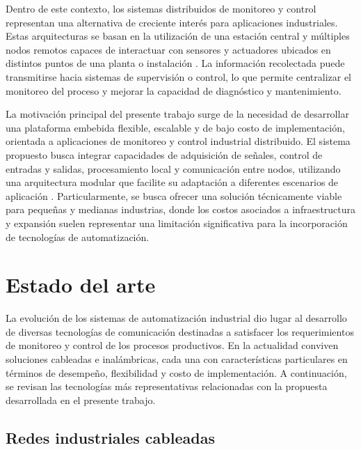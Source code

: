 Dentro de este contexto, los sistemas distribuidos de monitoreo y control representan una alternativa de creciente interés para aplicaciones industriales. Estas arquitecturas se basan en la utilización de una estación central y múltiples nodos remotos capaces de interactuar con sensores y actuadores ubicados en distintos puntos de una planta o instalación \cite{review_iwn_industry40}. La información recolectada puede transmitirse hacia sistemas de supervisión o control, lo que permite centralizar el monitoreo del proceso y mejorar la capacidad de diagnóstico y mantenimiento.

La motivación principal del presente trabajo surge de la necesidad de desarrollar una plataforma embebida flexible, escalable y de bajo costo de implementación, orientada a aplicaciones de monitoreo y control industrial distribuido. El sistema propuesto busca integrar capacidades de adquisición de señales, control de entradas y salidas, procesamiento local y comunicación entre nodos, utilizando una arquitectura modular que facilite su adaptación a diferentes escenarios de aplicación \cite{overview_embedded_i40}. Particularmente, se busca ofrecer una solución técnicamente viable para pequeñas y medianas industrias, donde los costos asociados a infraestructura y expansión suelen representar una limitación significativa para la incorporación de tecnologías de automatización.


\section{Estado del arte}

La evolución de los sistemas de automatización industrial dio lugar al desarrollo de diversas tecnologías de comunicación destinadas a satisfacer los requerimientos de monitoreo y control de los procesos productivos. En la actualidad conviven soluciones cableadas e inalámbricas, cada una con características particulares en términos de desempeño, flexibilidad y costo de implementación. A continuación, se revisan las tecnologías más representativas relacionadas con la propuesta desarrollada en el presente trabajo.

\subsection{Redes industriales cableadas}

